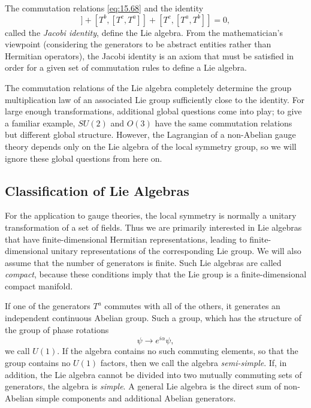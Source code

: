 The commutation relations \eqref{eq:15.68} and the identity
\begin{equation}
  [T^a, [T^b, T^c]] + [T^b, [T^c, T^a]] + [T^c, [T^a, T^b]] = 0 ,
  \label{eq:15.70}
\end{equation}
called the \emph{Jacobi identity}, define the Lie algebra.  From the
mathematician's viewpoint (considering the generators to be abstract entities
rather than Hermitian operators), the Jacobi identity is an axiom that must
be satisfied in order for a given set of commutation rules to define a Lie
algebra.

The commutation relations of the Lie algebra completely determine the group
multiplication law of an associated Lie group sufficiently close to the
identity.  For large enough transformations, additional global questions come
into play; to give a familiar example, $SU(2)$ and $O(3)$ have the same
commutation relations but different global structure.  However, the
Lagrangian of a non-Abelian gauge theory depends only on the Lie algebra of
the local symmetry group, so we will ignore these global questions from here
on.

\subsection{Classification of Lie Algebras}

For the application to gauge theories, the local symmetry is normally a
unitary transformation of a set of fields.  Thus we are primarily interested
in Lie algebras that have finite-dimensional Hermitian representations, leading
to finite-dimensional unitary representations of the corresponding Lie group.
We will also assume that the number of generators is finite.  Such Lie
algebras are called \emph{compact}, because these conditions imply that the
Lie group is a finite-dimensional compact manifold.

If one of the generators $T^a$ commutes with all of the others, it generates
an independent continuous Abelian group.  Such a group, which has the
structure of the group of phase rotations
\begin{equation}
  \psi \to e^{i\alpha}\psi ,
  \label{eq:15.71}
\end{equation}
we call $U(1)$.  If the algebra contains no such commuting elements, so that
the group contains no $U(1)$ factors, then we call the algebra
\emph{semi-simple}.  If, in addition, the Lie algebra cannot be divided into
two mutually commuting sets of generators, the algebra is \emph{simple}.  A
general Lie algebra is the direct sum of non-Abelian simple components and
additional Abelian generators.

